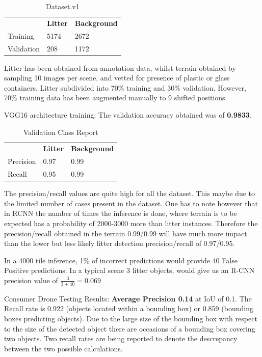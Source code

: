 \documentclass{IEEEtran}
\begin{document}
\begin{table}[h]
\centering
\caption{Dataset.v1}
\begin{tabular}{lll}
\textbf{}  & \textbf{Litter} & \textbf{Background} \\
Training   & 5174            & 2672                \\
Validation & 208             & 1172               
\end{tabular}
\end{table}

Litter has been obtained from annotation data, whilst terrain obtained by sampling 10 images per scene, and vetted for presence of plastic or glass containers. Litter subdivided into 70\% training and 30\%  validation. However, 70\% training data has been augmented manually to 9 shifted positions.\newline

VGG16 architecture training: The validation accuracy obtained was of \textbf{0.9833}. \newline

\begin{table}[h]
\centering
\caption{Validation Class Report}
\begin{tabular}{lll}
\textbf{} & \textbf{Litter} & \textbf{Background} \\
Precision & 0.97            & 0.99                \\
Recall    & 0.95            & 0.99               
\end{tabular}
\end{table}

The precision/recall values are quite high for all the dataset. This maybe due to the limited number of cases present in the dataset. One has to note however that in RCNN the number of times the inference is done, where terrain is to be expected has a probability of 2000-3000 more than litter instances. Therefore the precision/recall obtained in the terrain 0.99/0.99 will have much more impact than the lower but less likely litter detection precision/recall  of 0.97/0.95.\newline

In a 4000 tile inference, 1\% of incorrect predictions would provide 40 False Positive predictions. In a typical scene 3 litter objects, would give us an R-CNN precision value of $\frac{3}{3+40} = 0.069$


Consumer Drone Testing Results: \textbf{Average Precision 0.14} at IoU of 0.1. The Recall rate is 0.922 (objects located within a bounding box) or 0.859 (bounding boxes predicting objects). Due to the large size of the bounding box with respect to the size of the detected object there are occasions of a bounding box covering two objects. Two recall rates are being reported to denote the descrepancy between the two possible calculations.\newline
\end{document}
